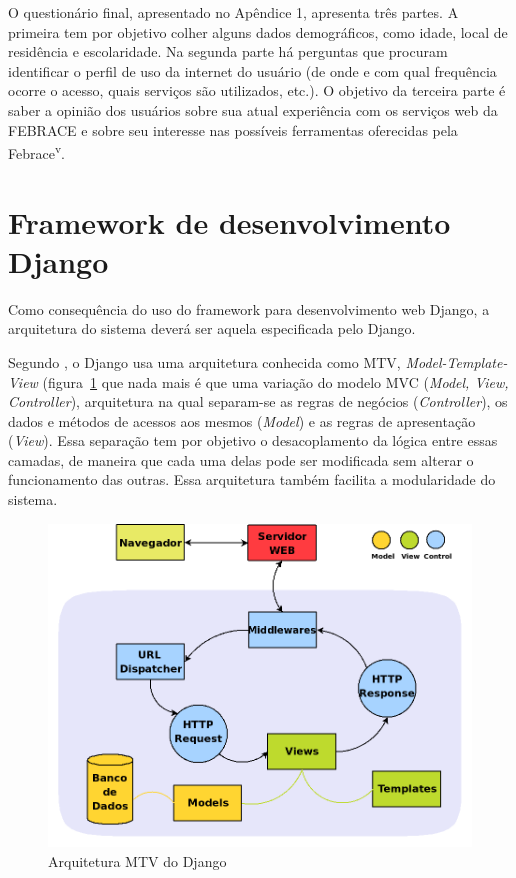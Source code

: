     O questionário final, apresentado no Apêndice 1, apresenta três partes. A primeira tem por objetivo colher alguns dados demográficos, como idade, local de residência e escolaridade. Na segunda parte há perguntas que procuram identificar o perfil de uso da internet do usuário (de onde e com qual frequência ocorre o acesso, quais serviços são utilizados, etc.). O objetivo da terceira parte é saber a opinião dos usuários sobre sua atual experiência com os serviços web da FEBRACE e sobre seu interesse nas possíveis ferramentas oferecidas pela Febrace\textsuperscript{v}.

\section{Framework de desenvolvimento Django}

    Como consequência do uso do framework para desenvolvimento web Django, a arquitetura do sistema deverá ser aquela especificada pelo Django.

    Segundo , o Django usa uma arquitetura conhecida como MTV, \textit{Model-Template-View} (figura~\ref{django_arquitetura} que nada mais é que uma variação do modelo MVC (\textit{Model, View, Controller}), arquitetura na qual separam-se as regras de negócios (\textit{Controller}), os dados e métodos de acessos aos mesmos (\textit{Model}) e as regras de apresentação (\textit{View}). Essa separação tem por objetivo o desacoplamento da lógica entre essas camadas, de maneira que cada uma delas pode ser modificada sem alterar o funcionamento das outras. Essa arquitetura também facilita a modularidade do sistema.

    \begin{figure}[h]
        \begin{center}
    \includegraphics[width=0.7\linewidth]{arquivos/django_arquitetura.png}
        \end{center}
        \caption{Arquitetura MTV do Django}
        \label{django_arquitetura}
    \end{figure}

